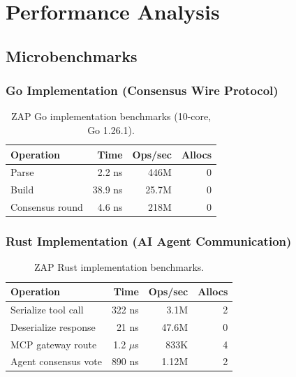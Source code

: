 \documentclass[11pt,letterpaper]{article}
\begin{document}
\section{Performance Analysis}

\subsection{Microbenchmarks}

\subsubsection{Go Implementation (Consensus Wire Protocol)}

\begin{table}[H]
\centering
\begin{tabular}{@{}lrrr@{}}
\toprule
\textbf{Operation} & \textbf{Time} & \textbf{Ops/sec} & \textbf{Allocs} \\
\midrule
Parse & 2.2 ns & 446M & 0 \\
Build & 38.9 ns & 25.7M & 0 \\
Consensus round & 4.6 ns & 218M & 0 \\
\bottomrule
\end{tabular}
\caption{ZAP Go implementation benchmarks (10-core, Go 1.26.1).}
\label{tab:go-bench}
\end{table}

\subsubsection{Rust Implementation (AI Agent Communication)}

\begin{table}[H]
\centering
\begin{tabular}{@{}lrrr@{}}
\toprule
\textbf{Operation} & \textbf{Time} & \textbf{Ops/sec} & \textbf{Allocs} \\
\midrule
Serialize tool call & 322 ns & 3.1M & 2 \\
Deserialize response & 21 ns & 47.6M & 0 \\
MCP gateway route & 1.2 $\mu$s & 833K & 4 \\
Agent consensus vote & 890 ns & 1.12M & 2 \\
\bottomrule
\end{tabular}
\caption{ZAP Rust implementation benchmarks.}
\label{tab:rust-bench}
\end{table}
\end{document}

